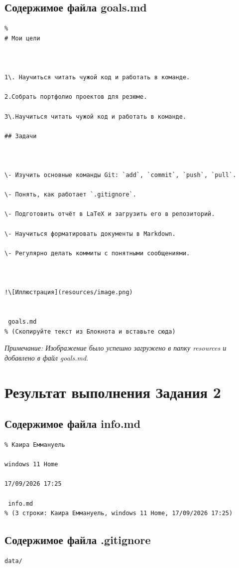 \documentclass[a4paper,12pt]{article}
\begin{document}
\subsection{Содержимое файла goals.md}
\begin{verbatim}
% 
# Мои цели



1\. Научиться читать чужой код и работать в команде.

2.Собрать портфолио проектов для резюме. 

3\.Научиться читать чужой код и работать в команде.

## Задачи



\- Изучить основные команды Git: `add`, `commit`, `push`, `pull`.

\- Понять, как работает `.gitignore`.

\- Подготовить отчёт в LaTeX и загрузить его в репозиторий.

\- Научиться форматировать документы в Markdown.

\- Регулярно делать коммиты с понятными сообщениями.



!\[Иллюстрация](resources/image.png)


 goals.md
% (Скопируйте текст из Блокнота и вставьте сюда)
\end{verbatim}
\textit{Примечание: Изображение было успешно загружено в папку resources и добавлено в файл goals.md.}
\section{Результат выполнения Задания 2}
\subsection{Содержимое файла info.md}
\begin{verbatim}
% Каира Еммануель

windows 11 Home

17/09/2026 17:25

 info.md
% (3 строки: Каира Еммануель, windows 11 Home, 17/09/2026 17:25)
\end{verbatim}
\subsection{Содержимое файла .gitignore}
\begin{verbatim}
data/
\end{verbatim}
\end{document}
